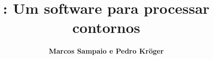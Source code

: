 \documentclass{sciposter}
\title{\goiaba{}: Um software para processar contornos}
\author{\textbf{Marcos Sampaio e Pedro Kröger}}
\institute{Genos---Grupo de pesquisa em computação musical}
\begin{document}



\maketitle

\begin{multicols}{3}

\end{multicols}

\begin{center}

\begin{multicols}{2}

\end{multicols}

\end{center}

\begin{multicols}{3}

\renewcommand{\refname}{Bibliografia}




\end{multicols}
\end{document}
